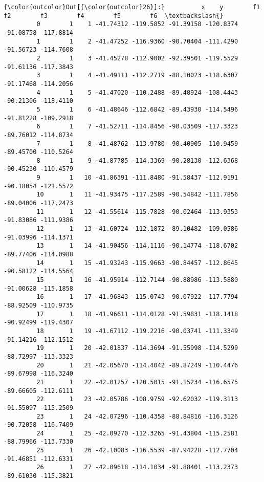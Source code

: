 \documentclass[11pt]{article}
\begin{document}
\begin{Verbatim}[commandchars=\\\{\}]
{\color{outcolor}Out[{\color{outcolor}26}]:}          x    y        f1        f2        f3        f4        f5        f6  \textbackslash{}
         0        1    1 -41.74312 -119.5852 -91.39158 -120.8374 -91.08758 -117.8814   
         1        1    2 -41.47252 -116.9360 -90.70404 -111.4290 -91.56723 -114.7608   
         2        1    3 -41.45278 -112.9002 -92.39501 -119.5529 -91.61136 -117.3843   
         3        1    4 -41.49111 -112.2719 -88.10023 -118.6307 -91.17468 -114.2056   
         4        1    5 -41.47020 -110.2488 -89.48924 -108.4443 -90.21306 -118.4110   
         5        1    6 -41.48646 -112.6842 -89.43930 -114.5496 -91.81228 -109.2918   
         6        1    7 -41.52711 -114.8456 -90.03509 -117.3323 -89.76012 -114.8734   
         7        1    8 -41.48762 -113.9780 -90.40905 -110.9459 -89.45700 -110.5264   
         8        1    9 -41.87785 -114.3369 -90.28130 -112.6368 -90.45230 -110.4579   
         9        1   10 -41.86391 -111.8480 -91.58437 -112.9191 -90.18054 -121.5572   
         10       1   11 -41.93475 -117.2589 -90.54842 -111.7856 -89.04006 -117.2473   
         11       1   12 -41.55614 -115.7828 -90.02464 -113.9353 -91.83086 -111.9386   
         12       1   13 -41.60724 -112.1872 -89.10482 -109.0586 -91.03996 -114.1371   
         13       1   14 -41.90456 -114.1116 -90.14774 -118.6702 -89.77406 -114.0988   
         14       1   15 -41.93243 -115.9663 -90.84457 -112.8645 -90.58122 -114.5564   
         15       1   16 -41.95914 -112.7144 -90.88986 -113.5880 -91.00628 -115.1858   
         16       1   17 -41.96843 -115.0743 -90.07922 -117.7794 -88.92509 -110.9735   
         17       1   18 -41.96611 -114.0128 -91.59831 -118.1418 -90.92499 -119.4307   
         18       1   19 -41.67112 -119.2216 -90.03741 -111.3349 -91.14216 -112.1512   
         19       1   20 -42.01837 -114.3694 -91.55998 -114.5299 -88.72997 -113.3323   
         20       1   21 -42.05670 -114.4042 -89.87249 -110.4476 -89.67998 -116.3240   
         21       1   22 -42.01257 -120.5015 -91.15234 -116.6575 -89.66605 -112.6111   
         22       1   23 -42.05786 -108.9759 -92.62032 -119.3113 -91.55097 -115.2509   
         23       1   24 -42.07296 -110.4358 -88.84816 -116.3126 -90.72058 -116.7409   
         24       1   25 -42.09270 -112.3265 -91.43804 -115.2581 -88.79966 -113.7330   
         25       1   26 -42.10083 -116.5539 -87.94228 -112.7704 -91.46851 -112.6331   
         26       1   27 -42.09618 -114.1034 -91.88401 -113.2373 -89.61030 -115.3821   

\end{Verbatim}
\end{document}
